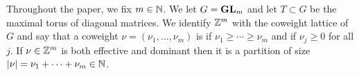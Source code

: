 \documentclass{article} %
\begin{document}
Throughout the paper, we fix $ m \in \mathbb N$.  We let $G = {\mathbf{GL}}_m$ and let $T\subset G$ be the maximal torus of diagonal matrices. 
We identify $\mathbb Z^m$ with the coweight lattice of $G$ and say that a coweight 
% 
% 
% 
$\nu = (\nu_1,\dots,\nu_m)$ is  if $\nu_1\ge\cdots\ge\nu_m$ and  if $\nu_j\ge 0$ for all $j$.
% 
If $\nu\in\mathbb Z^m$ is both effective and dominant then it is a partition of size $|\nu| = \nu_1 + \cdots + \nu_m\in\mathbb N$.
% 
% 
\end{document}

